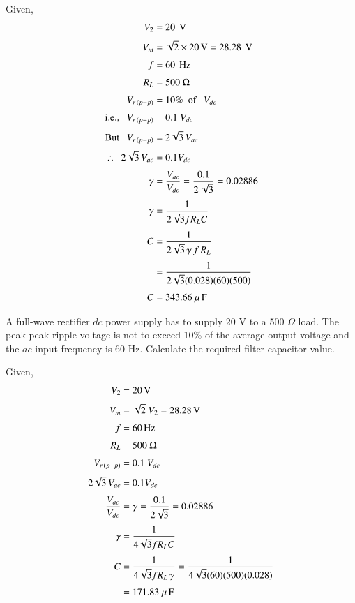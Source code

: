 \begin{solution}
Given,
\begin{align*}
V_2 & = 20 ~ \operatorname{\mathrm{V}} \\[3pt]
V_m & = \sqrt{2}\times 20\operatorname{\mathrm{V}} = 28.28 ~ \operatorname{\mathrm{V}} \\[3pt]
f & = 60 ~ \operatorname{Hz}\\[3pt]
R_L & = 500 ~ \Omega\\[3pt]
V_{r\,(p-p)} & = 10 \% \text{~ of ~} ~V_{dc} \\[3pt]
\text{i.e., } ~~ V_{r\,(p-p)} & = 0.1 ~V_{dc}\\[3pt]
\text{But } ~~ V_{r\,(p-p)} & = 2 \sqrt{3}\, V_{ac} \\[3pt]
\therefore ~~ 2 \sqrt{3}\, V_{ac} & = 0.1 V_{dc}\\[3pt]
\gamma & = \frac{V_{ac}}{V_{dc}} = \frac{0.1}{2\,\sqrt{3}} = 0.02886\\[3pt]
\gamma & = \frac{1}{2 \sqrt{3} f R_L C}\\[3pt]
C& = \frac{1}{2 \sqrt{3}\, \gamma\, f\, R_L}\\[3pt]
 & = \frac{1}{2 \sqrt{3} (0.028) (60) (500)}\\[3pt]
C & = 343.66  ~ \mu \operatorname{F}
\end{align*}
\vskip -1cm
\end{solution}

\begin{example}\label{exam2.22}
A full-wave rectifier $dc$ power supply has to supply 20 V to a 500
$\Omega$ load. The peak-peak ripple voltage is not to exceed 10\% of the
average output voltage and the $ac$ input frequency is 60
Hz. Calculate the required filter capacitor value.
\end{example}

\begin{solution}
Given, 
\begin{align*}
V_2 & = 20 \operatorname{\mathrm{V}} \\[3pt]
V_m & = \sqrt{2} ~ V_2 = 28.28 \operatorname{\mathrm{V}}\\[3pt]
f & = 60 \operatorname{Hz}\\[3pt]
R_L & = 500 ~\Omega\\[3pt]
V_{r\,(p-p)} & = 0.1 ~V_{dc}\\[3pt]
2 \sqrt{3}\, V_{ac} & = 0.1 V_{dc} \\[3pt]
\frac{V_{ac}}{V_{dc}} & = \gamma = \frac{0.1}{2 \sqrt{3}} = 0.02886\\[3pt]
\gamma & = \frac{1}{4 \sqrt{3} f R_L C}\\[3pt]
C & = \frac{1}{4 \sqrt{3} f R_L\, \gamma} = \frac{1}{4 \sqrt{3} (60)
  (500) (0.028)}\\[3pt]
&  = 171.83 ~ \mu \operatorname{F}
\end{align*}
\vskip -1cm
\end{solution}

